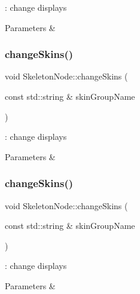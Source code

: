 \+: change displays 


\begin{DoxyParams}{Parameters}
{\em } & \\
\hline
\end{DoxyParams}
\mbox{\label{classSkeletonNode_af9f13ad397a5d190500224d2ab510324}} 
\subsubsection{\texorpdfstring{change\+Skins()}{changeSkins()}\hspace{0.1cm}{\footnotesize\ttfamily [3/4]}}
{\footnotesize\ttfamily void Skeleton\+Node\+::change\+Skins (\begin{DoxyParamCaption}\item[{const std\+::string \&}]{skin\+Group\+Name }\end{DoxyParamCaption})}



\+: change displays 


\begin{DoxyParams}{Parameters}
{\em } & \\
\hline
\end{DoxyParams}
\mbox{\label{classSkeletonNode_af9f13ad397a5d190500224d2ab510324}} 
\subsubsection{\texorpdfstring{change\+Skins()}{changeSkins()}\hspace{0.1cm}{\footnotesize\ttfamily [4/4]}}
{\footnotesize\ttfamily void Skeleton\+Node\+::change\+Skins (\begin{DoxyParamCaption}\item[{const std\+::string \&}]{skin\+Group\+Name }\end{DoxyParamCaption})}



\+: change displays 


\begin{DoxyParams}{Parameters}
{\em } & \\
\hline
\end{DoxyParams}
\mbox{\label{classSkeletonNode_a1a1a0f5338469b1cfc12e51d393c333d}} 
